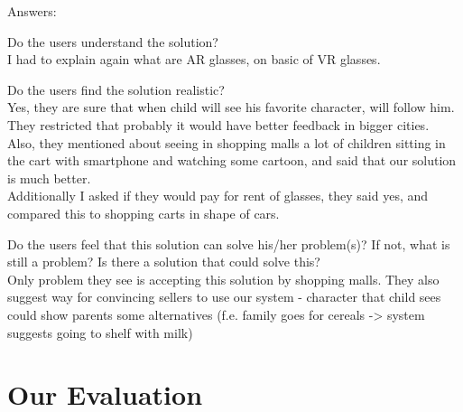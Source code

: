 \documentclass[a4paper,10pt,oneside]{scrreprt}
\begin{document}
Answers:
\begin{compactitem}
	\item Do the users understand the solution?\\
	I had to explain again what are AR glasses, on basic of VR glasses.\\

	\item Do the users find the solution realistic?\\
	Yes, they are sure that when child will see his favorite character, will follow him. They restricted that probably it would have better feedback in bigger cities.\\
	Also, they mentioned about seeing in shopping malls a lot of children sitting in the cart with smartphone and watching some cartoon, and said that our solution is much better.\\
	Additionally I asked if they would pay for rent of glasses, they said yes, and compared this to shopping carts in shape of cars.\\

	\item Do the users feel that this solution can solve his/her problem(s)? If not, what is still
	a problem? Is there a solution that could solve this?\\
	Only problem they see is accepting this solution by shopping malls. They also suggest way for convincing sellers to use our system - character that child sees could show parents some alternatives (f.e. family goes for cereals -> system suggests going to shelf with milk)\\
\end{compactitem}

\clearpage

\chapter{Our Evaluation}
\end{document}
